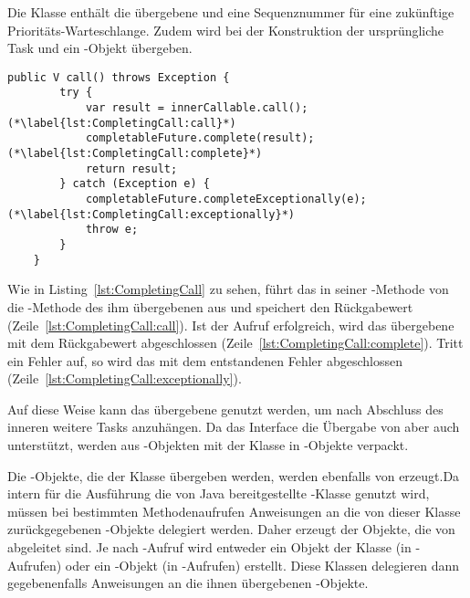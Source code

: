 Die Klasse  enthält die übergebene  und eine Sequenznummer für eine zukünftige Prioritäts-Warteschlange. Zudem wird bei der Konstruktion der ursprüngliche Task und ein -Objekt übergeben. 
\begin{lstlisting}[caption={\code{call()}-Methode von \class{CompletingCallable}. Das enthaltene \class{Callable} wird ausgeführt und dann das \class{CompletableFuture} abgeschlossen.}, label={lst:CompletingCall},float={thbp}]
	public V call() throws Exception {
		try {
			var result = innerCallable.call(); (*\label{lst:CompletingCall:call}*)
			completableFuture.complete(result); (*\label{lst:CompletingCall:complete}*)
			return result;
		} catch (Exception e) {
			completableFuture.completeExceptionally(e); (*\label{lst:CompletingCall:exceptionally}*)
			throw e;
		}
	}
\end{lstlisting}
Wie in Listing~\vref{lst:CompletingCall} zu sehen, führt das  in seiner -Methode von die -Methode des ihm übergebenen   aus und speichert den Rückgabewert (Zeile~\ref{lst:CompletingCall:call}). Ist der Aufruf erfolgreich, wird das übergebene  mit dem Rückgabewert abgeschlossen (Zeile~\ref{lst:CompletingCall:complete}). Tritt ein Fehler auf, so wird das   mit dem entstandenen Fehler abgeschlossen (Zeile~\ref{lst:CompletingCall:exceptionally}).

Auf diese Weise kann das übergebene  genutzt werden, um nach Abschluss des inneren  weitere Tasks anzuhängen.
Da das Interface  die Übergabe von  aber auch  unterstützt, werden aus -Objekten mit der Klasse  in -Objekte verpackt.

Die -Objekte, die der Klasse  übergeben werden, werden ebenfalls von  erzeugt.Da intern für die Ausführung die von Java bereitgestellte -Klasse genutzt wird, müssen bei bestimmten Methodenaufrufen Anweisungen an die von dieser Klasse zurückgegebenen -Objekte delegiert werden. Daher erzeugt der 
 Objekte, die von  abgeleitet sind. Je nach -Aufruf wird entweder ein Objekt der Klasse  (in -Aufrufen) oder ein -Objekt (in -Aufrufen) erstellt. Diese Klassen delegieren dann gegebenenfalls Anweisungen an die ihnen übergebenen -Objekte.

